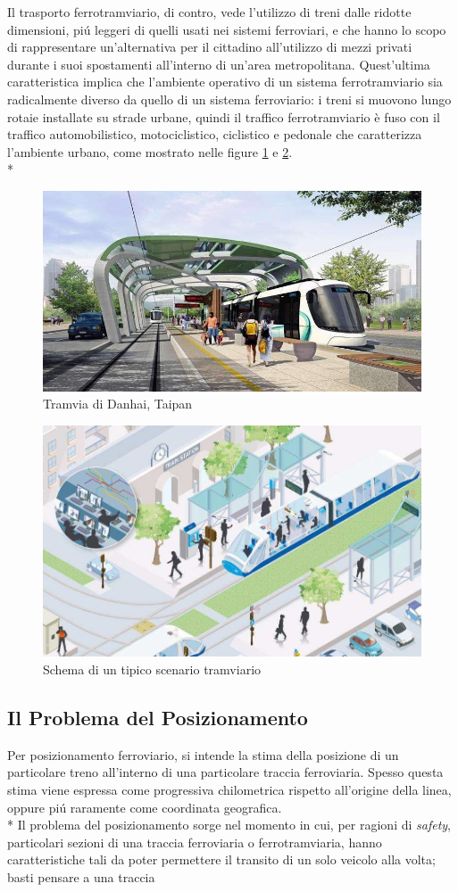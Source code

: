 Il trasporto ferrotramviario, di contro, vede l'utilizzo di treni dalle ridotte dimensioni, pi\'u leggeri di quelli usati nei sistemi ferroviari, e che hanno lo scopo di rappresentare un'alternativa per il cittadino all'utilizzo di mezzi privati durante i suoi spostamenti all'interno di un'area metropolitana. Quest'ultima caratteristica implica che l'ambiente operativo di un sistema ferrotramviario sia radicalmente diverso da quello di un sistema ferroviario: i treni si muovono lungo rotaie installate su strade urbane, quindi il traffico ferrotramviario \`e fuso con il traffico automobilistico, motociclistico, ciclistico e pedonale che caratterizza l'ambiente urbano, come mostrato nelle figure \ref{fig:danhai} e \ref{fig:tramschema}.\\*
\begin{figure}[h]
	\centering
	\includegraphics[width=0.7\linewidth]{img/danhai}
	\caption{Tramvia di Danhai, Taipan}
	\label{fig:danhai}
\end{figure}
\begin{figure}[h]
	\centering
	\includegraphics[width=0.7\linewidth]{img/twschema}
	\caption{Schema di un tipico scenario tramviario}
	\label{fig:tramschema}
\end{figure}
\subsection{Il Problema del Posizionamento}
Per posizionamento ferroviario, si intende la stima della posizione di un particolare treno all'interno di una particolare traccia ferroviaria. Spesso questa stima viene espressa come progressiva chilometrica rispetto all'origine della linea, oppure pi\'u raramente come coordinata geografica.\\*
Il problema del posizionamento sorge nel momento in cui, per ragioni di \emph{safety}, particolari sezioni di una traccia ferroviaria o ferrotramviaria, hanno caratteristiche tali da poter permettere il transito di un solo veicolo alla volta; basti pensare a una traccia 